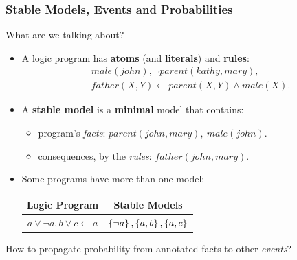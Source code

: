 \documentclass[bigger,xcolor={x11names,svgnames}]{beamer}
\begin{document}
%
\begin{frame}
    \frametitle{Stable Models, Events and Probabilities}
    \vfill
    \begin{center}
        What are we talking about?
    \end{center}
    \vfill
    \begin{itemize}
        \item A logic program has \textbf{atoms} (and \textbf{literals}) and \textbf{rules}:
            $$
            \begin{aligned}
                &male(john), \neg parent(kathy,mary), \\
                &father(X, Y) \leftarrow parent(X, Y) \wedge male(X).
            \end{aligned}
            $$
        \item A \alert{\textbf{stable model}} is a \textbf{minimal} model that contains:
              \begin{itemize}
                  \item program's \emph{facts}: $parent(john,mary),~male(john)$.
                  \item consequences, by the \emph{rules}: $father(john,mary)$.
              \end{itemize}
        \item Some programs have more than one model:
              \begin{tabular}{c|c}
                  \textbf{Logic Program} & \textbf{Stable Models} \\
                  \hline
                  $a \vee \neg a,  b \vee c \leftarrow a$
                                         &
                  $\set{\neg a}, \set{a, b}, \set{a, c}$
              \end{tabular}
    \end{itemize}
    \vfill
    \begin{center}
        How to propagate probability from annotated facts to other \emph{events}?
    \end{center}
\end{frame}
%
\end{document}
